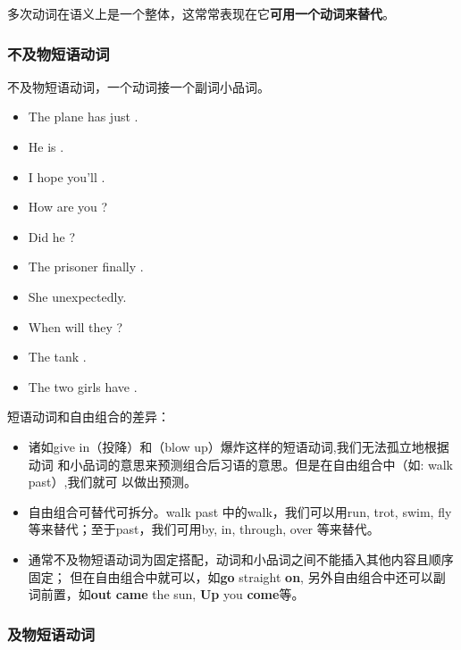 多次动词在语义上是一个整体，这常常表现在它\textbf{可用一个动词来替代}。
\subsubsection{不及物短语动词}

不及物短语动词，一个动词接一个副词小品词。
\begin{itemize}
\item The plane has just .
\item He is .
\item I hope you'll .
\item How are you ?
\item Did he ?
\item The prisoner finally .
\item She  unexpectedly.
\item When will they ?
\item The tank .
\item The two girls have .

\end{itemize}

短语动词和自由组合的差异：
\begin{itemize}
\item 诸如give in（投降）和（blow up）爆炸这样的短语动词,我们无法孤立地根据动词
和小品词的意思来预测组合后习语的意思。但是在自由组合中（如: walk past）,我们就可
以做出预测。

\item 自由组合可替代可拆分。walk past 中的walk，我们可以用run, trot, swim,
  fly 等来替代；至于past，我们可用by, in, through, over 等来替代。


\item 通常不及物短语动词为固定搭配，动词和小品词之间不能插入其他内容且顺序固定；
但在自由组合中就可以，如\textbf{go} straight \textbf{on}, 另外自由组合中还可以副
词前置，如\textbf{out} \textbf{came} the sun, \textbf{Up} you \textbf{come}等。

\end{itemize}

\subsubsection{及物短语动词}

